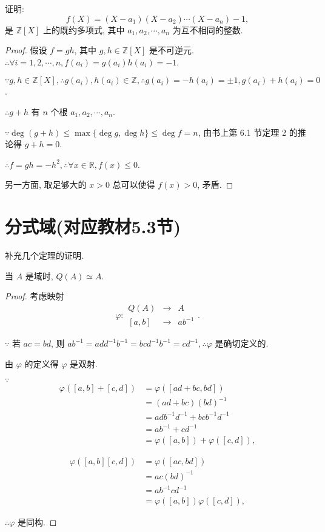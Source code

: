 \documentclass[UTF8]{ctexart}
\begin{document}
\begin{example}
    证明:
    \[f(X)=(X-a_1)(X-a_2)\cdots(X-a_n)-1,\]
    是 $\mathbb{Z}[X]$ 上的既约多项式, 其中 $a_1,a_2,\cdots,a_n$ 为互不相同的整数.
\end{example}
\begin{proof}
    假设 $f=gh$, 其中 $g,h\in\mathbb{Z}[X]$ 是不可逆元. $\therefore\forall i=1,2,\cdots,n,f(a_i)=g(a_i)h(a_i)=-1$.

    $\because g,h\in\mathbb{Z}[X],\therefore g(a_i),h(a_i)\in\mathbb{Z},\therefore g(a_i)=-h(a_i)=\pm 1,g(a_i)+h(a_i)=0$.

    $\therefore g+h$ 有 $n$ 个根 $a_1,a_2,\cdots,a_n$.

    $\because\deg(g+h)\leq\max\{\deg g,\deg h\}\leq\deg f=n$, 由书上第 6.1 节定理 2 的推论得 $g+h=0$.

    $\therefore f=gh=-h^2,\therefore\forall x\in\mathbb{R},f(x)\leq0$.

    另一方面, 取足够大的 $x>0$ 总可以使得 $f(x)>0$, 矛盾.
\end{proof}
\section{分式域(对应教材5.3节)}
补充几个定理的证明.
\begin{theorem}\label{t4.1}
    当 $A$ 是域时, $Q(A)\simeq A$.
\end{theorem}
\begin{proof}
    考虑映射
    \[\varphi:\begin{array}{rcl}
        Q(A) & \to & A \\[3pt]
        [a,b] & \to & ab^{-1}
    \end{array}.\]

    $\because$ 若 $ac=bd$, 则 $ab^{-1}=add^{-1}b^{-1}=bcd^{-1}b^{-1}=cd^{-1},\therefore\varphi$ 是确切定义的.

    由 $\varphi$ 的定义得 $\varphi$ 是双射.

    $\because$
    \begin{align*}
        \varphi([a,b]+[c,d]) & =\varphi([ad+bc,bd]) \\
        & =(ad+bc)(bd)^{-1} \\
        & =adb^{-1}d^{-1}+bcb^{-1}d^{-1} \\
        & =ab^{-1}+cd^{-1} \\
        & =\varphi([a,b])+\varphi([c,d]),
    \end{align*}
    
    \begin{align*}
        \varphi([a,b][c,d]) & =\varphi([ac,bd]) \\
        & =ac(bd)^{-1} \\
        & =ab^{-1}cd^{-1} \\
        & =\varphi([a,b])\varphi([c,d]),
    \end{align*}

    $\therefore\varphi$ 是同构.
\end{proof}
\end{document}
